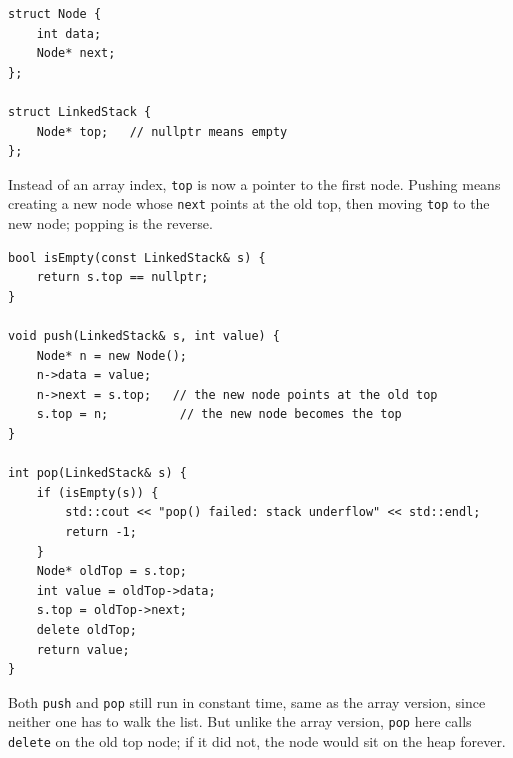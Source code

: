 \begin{verbatim}
struct Node {
    int data;
    Node* next;
};

struct LinkedStack {
    Node* top;   // nullptr means empty
};
\end{verbatim}

Instead of an array index, \texttt{top} is now a pointer to the first node. Pushing means creating a new node whose \texttt{next} points at the old top, then moving \texttt{top} to the new node; popping is the reverse.

\begin{center}
\end{center}

\begin{verbatim}
bool isEmpty(const LinkedStack& s) {
    return s.top == nullptr;
}

void push(LinkedStack& s, int value) {
    Node* n = new Node();
    n->data = value;
    n->next = s.top;   // the new node points at the old top
    s.top = n;          // the new node becomes the top
}

int pop(LinkedStack& s) {
    if (isEmpty(s)) {
        std::cout << "pop() failed: stack underflow" << std::endl;
        return -1;
    }
    Node* oldTop = s.top;
    int value = oldTop->data;
    s.top = oldTop->next;
    delete oldTop;
    return value;
}
\end{verbatim}

Both \texttt{push} and \texttt{pop} still run in constant time, same as the array version, since neither one has to walk the list. But unlike the array version, \texttt{pop} here calls \texttt{delete} on the old top node; if it did not, the node would sit on the heap forever.


